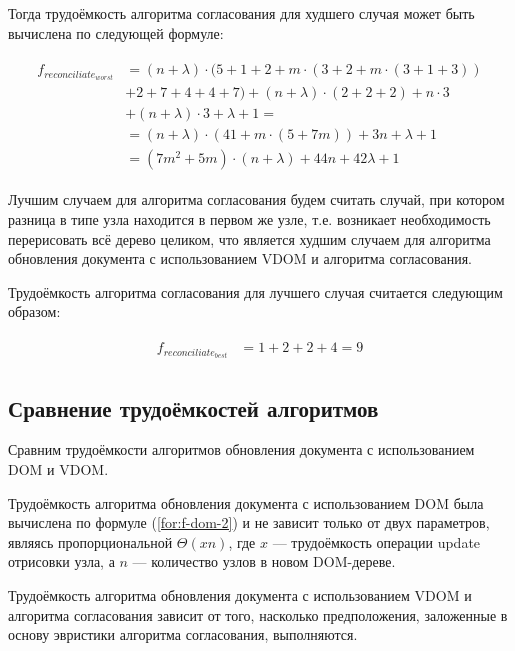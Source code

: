Тогда трудоёмкость алгоритма согласования для худшего случая может быть вычислена по следующей формуле:

\begin{align}
	\begin{split}
		\label{for:f-reconciliation-worst}
		f_{reconciliate_{worst}} &= (n + \lambda) \cdot (5 + 1 + 2 + m \cdot (3 + 2 + m \cdot (3 + 1 + 3)) \\
		&+ 2 + 7 + 4 + 4 + 7) + (n + \lambda) \cdot (2 + 2 + 2) + n \cdot 3 \\
		&+ (n + \lambda) \cdot 3 + \lambda + 1 =\\
		&= (n + \lambda) \cdot (41 + m \cdot (5 + 7m)) + 3n + \lambda + 1 \\
		&= (7m^2 + 5m)\cdot(n + \lambda) + 44n + 42\lambda + 1
	\end{split}
\end{align}

Лучшим случаем для алгоритма согласования будем считать случай, при котором разница в типе узла находится в первом же узле, т.е. возникает необходимость перерисовать всё дерево целиком, что является худшим случаем для алгоритма обновления документа с использованием VDOM и алгоритма согласования.

Трудоёмкость алгоритма согласования для лучшего случая считается следующим образом: 

\begin{align}
	\begin{split}
		\label{for:f-reconciliation-best}
		f_{reconciliate_{best}} &= 1 + 2 + 2 + 4 = 9
	\end{split}
\end{align}

\subsection{Сравнение трудоёмкостей алгоритмов}

Сравним трудоёмкости алгоритмов обновления документа с использованием DOM и VDOM.

Трудоёмкость алгоритма обновления документа с использованием DOM была вычислена по формуле (\ref{for:f-dom-2}) и не зависит только от двух параметров, являясь пропорциональной $\Theta(xn)$, где $x$ --- трудоёмкость операции update отрисовки узла, а $n$ --- количество узлов в новом DOM-дереве.

Трудоёмкость алгоритма обновления документа с использованием VDOM и алгоритма согласования зависит от того, насколько предположения, заложенные в основу эвристики алгоритма согласования, выполняются.

